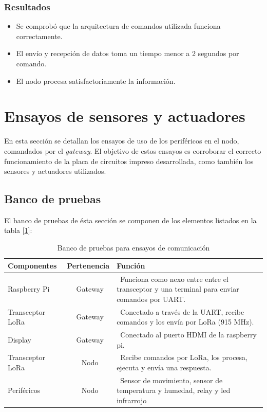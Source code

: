 \subsubsection{Resultados}

\begin{itemize}
\item Se comprobó que la arquitectura de comandos utilizada funciona correctamente.
\item El envío y recepción de datos toma un tiempo menor a 2 segundos por comando.
\item El nodo procesa satisfactoriamente la información.
\end{itemize}


\section{Ensayos de sensores y actuadores}

En esta sección se detallan los ensayos de uso de los periféricos en el nodo, comandados por el {\textit{gateway}}. El objetivo de estos ensayos es corroborar el correcto funcionamiento de la placa de circuitos impreso desarrollada, como también los sensores y actuadores utilizados.

\subsection{Banco de pruebas}

El banco de pruebas de ésta sección se componen de los elementos listados en la tabla [\ref{tab:bancodepruebas2}]:

\begin{table}[h]
	\centering
	\caption[Banco de pruebas 2]{Banco de pruebas para ensayos de comunicación}
	\begin{tabular}{l c m{7.5cm}}    
		\toprule
		\textbf{Componentes}  		& \textbf{Pertenencia}     	& \textbf{Función}																				\\
		\midrule
		Raspberry Pi				& \ Gateway 				& \ Funciona como nexo entre entre el transceptor y una terminal para enviar comandos por UART.	\\
		Transceptor LoRa 			& \ Gateway					& \ Conectado a través de la UART, recibe comandos y los envía por LoRa (915 MHz). 				\\
		Display	 					& \ Gateway 				& \ Conectado al puerto HDMI de la raspberry pi. 												\\
		Transceptor LoRa		 	& \ Nodo 					& \ Recibe comandos por LoRa, los procesa, ejecuta y envía una respuesta.						\\
		Periféricos		 			& \ Nodo 					& \ Sensor de movimiento, sensor de temperatura y humedad, relay y led infrarrojo				\\
		\bottomrule
		\hline
	\end{tabular}
	\label{tab:bancodepruebas2}
\end{table}

